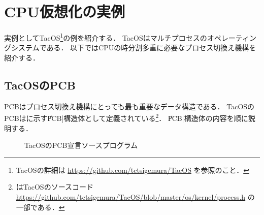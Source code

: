 \section{CPU仮想化の実例}
実例としてTacOS\footnote{TacOSの詳細は
\url{https://github.com/tctsigemura/TacOS}
を参照のこと．}の例を紹介する．
TacOSはマルチプロセスのオペレーティングシステムである．
以下ではCPUの時分割多重に必要なプロセス切換え機構を紹介する．

\subsection{TacOSのPCB}
PCBはプロセス切換え機構にとっても最も重要なデータ構造である．
TacOSのPCBはに示す\|PCB|構造体として定義されている\footnote{
はTacOSのソースコード
\url{https://github.com/tctsigemura/TacOS/blob/master/os/kernel/process.h}
の一部である．}．
\|PCB|構造体の内容を順に説明する．

\begin{figure}[btp]

\caption{TacOSのPCB宣言ソースプログラム}
\label{fig:tacosPCB}
\end{figure}

